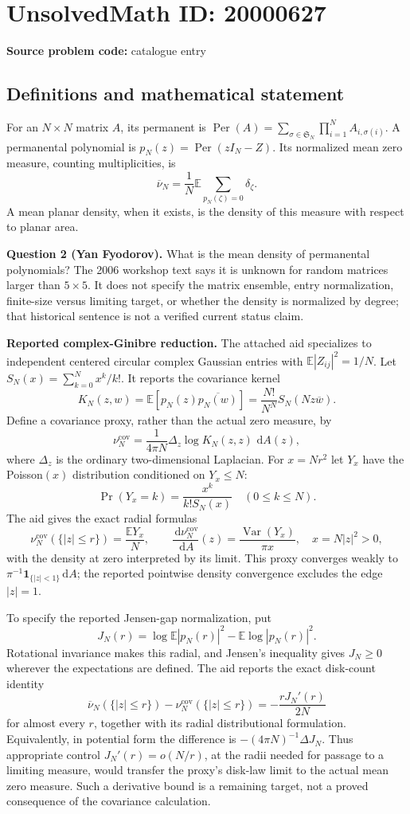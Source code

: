 \documentclass[11pt]{article}
\newcommand{\E}{\mathbb{E}}
\newcommand{\dd}{\,\mathrm{d}}
\begin{document}
\section*{UnsolvedMath ID: 20000627}
\textbf{Source problem code:} catalogue entry
\subsection{Definitions and mathematical statement}
For an $N\times N$ matrix $A$, its permanent is $\operatorname{Per}(A)=\sum_{\sigma\in\mathfrak S_N}\prod_{i=1}^NA_{i,\sigma(i)}$. A permanental polynomial is $p_N(z)=\operatorname{Per}(zI_N-Z)$. Its normalized mean zero measure, counting multiplicities, is
\[
 \overline\nu_N=\frac1N\E\sum_{p_N(\zeta)=0}\delta_\zeta.
\]
A mean planar density, when it exists, is the density of this measure with respect to planar area.

\textbf{Question 2 (Yan Fyodorov).} What is the mean density of permanental polynomials? The 2006 workshop text says it is unknown for random matrices larger than $5\times5$. It does not specify the matrix ensemble, entry normalization, finite-size versus limiting target, or whether the density is normalized by degree; that historical sentence is not a verified current status claim.

\textbf{Reported complex-Ginibre reduction.} The attached aid specializes to independent centered circular complex Gaussian entries with $\E|Z_{ij}|^2=1/N$. Let $S_N(x)=\sum_{k=0}^Nx^k/k!$. It reports the covariance kernel
\[
 K_N(z,w)=\E[p_N(z)\overline{p_N(w)}]=\frac{N!}{N^N}S_N(Nz\overline w).
\]
Define a covariance proxy, rather than the actual zero measure, by
\[
 \nu_N^{\mathrm{cov}}=\frac1{4\pi N}\Delta_z\log K_N(z,z)\,\dd A(z),
\]
where $\Delta_z$ is the ordinary two-dimensional Laplacian. For $x=Nr^2$ let $Y_x$ have the Poisson$(x)$ distribution conditioned on $Y_x\leq N$:
\[
 \Pr(Y_x=k)=\frac{x^k}{k!S_N(x)}\quad(0\leq k\leq N).
\]
The aid gives the exact radial formulas
\[
 \nu_N^{\mathrm{cov}}(\{|z|\leq r\})=\frac{\E Y_x}{N},\qquad
 \frac{\dd\nu_N^{\mathrm{cov}}}{\dd A}(z)=\frac{\operatorname{Var}(Y_x)}{\pi x},\quad x=N|z|^2>0,
\]
with the density at zero interpreted by its limit. This proxy converges weakly to $\pi^{-1}\mathbf1_{\{|z|<1\}}\dd A$; the reported pointwise density convergence excludes the edge $|z|=1$.

To specify the reported Jensen-gap normalization, put
\[
 J_N(r)=\log\E|p_N(r)|^2-\E\log|p_N(r)|^2.
\]
Rotational invariance makes this radial, and Jensen's inequality gives $J_N\geq0$ wherever the expectations are defined. The aid reports the exact disk-count identity
\[
 \overline\nu_N(\{|z|\leq r\})-
 \nu_N^{\mathrm{cov}}(\{|z|\leq r\})
 =-\frac{rJ_N'(r)}{2N}
\]
for almost every $r$, together with its radial distributional formulation. Equivalently, in potential form the difference is $-(4\pi N)^{-1}\Delta J_N$. Thus appropriate control $J_N'(r)=o(N/r)$, at the radii needed for passage to a limiting measure, would transfer the proxy's disk-law limit to the actual mean zero measure. Such a derivative bound is a remaining target, not a proved consequence of the covariance calculation.
\end{document}
